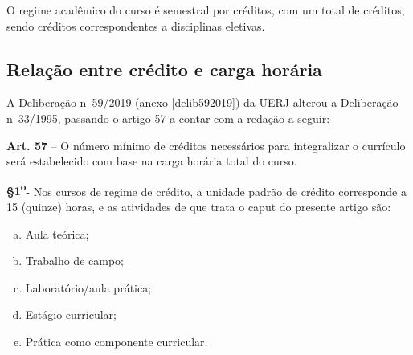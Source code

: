 O regime acadêmico do curso é semestral por créditos, com um total de \tCredCurso créditos, sendo \credEletivas créditos correspondentes a disciplinas eletivas.

\subsection{Relação entre crédito e carga horária}
A Deliberação n\textordmasculine~59/2019 (anexo \ref{delib592019}) da UERJ alterou a Deliberação n\textordmasculine~33/1995, passando o artigo 57 a contar com a redação a seguir:

\begin{itquotation}
    \textbf{Art. 57} -- O número mínimo de créditos necessários para integralizar o currículo será estabelecido com base na carga horária total do curso.

    \textbf{\S 1\textsuperscript{o}}- Nos cursos de regime de crédito, a unidade padrão de crédito
    corresponde a 15 (quinze) horas, e as atividades de que trata o caput do
    presente artigo são:
    \begin{enumerate}[a)]
        \item Aula teórica;
        \item Trabalho de campo;
        \item Laboratório/aula prática;
        \item Estágio curricular;
        \item Prática como componente curricular.
    \end{enumerate}
\end{itquotation}
